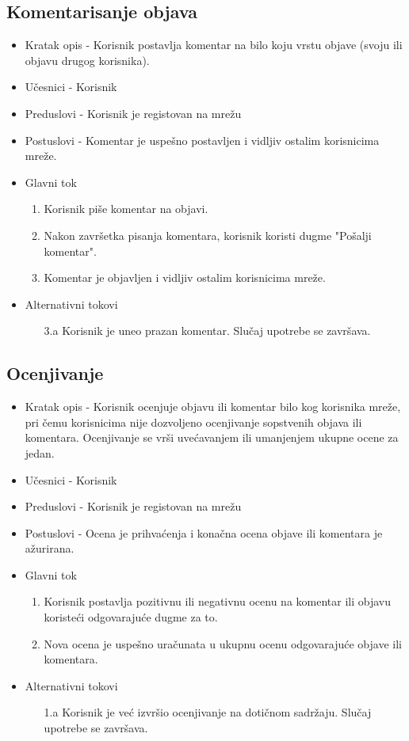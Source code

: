 \subsection{Komentarisanje objava}
\begin{itemize}
\item Kratak opis - Korisnik postavlja komentar na bilo koju vrstu objave (svoju ili objavu drugog korisnika). 
\item Učesnici - Korisnik
\item Preduslovi - Korisnik je registovan na mrežu
\item Postuslovi - Komentar je uspešno postavljen i vidljiv ostalim korisnicima mreže.
\item Glavni tok
	\begin{enumerate}
	\item Korisnik piše komentar na objavi.
	\item Nakon završetka pisanja komentara, korisnik koristi dugme "Pošalji komentar". 
	\item Komentar je objavljen i vidljiv ostalim korisnicima mreže.
	\end{enumerate}
\item Alternativni tokovi
    \begin{itemize}
	\item[3.a] Korisnik je uneo prazan komentar. Slučaj upotrebe se završava.
	\end{itemize}
\end{itemize}

\subsection{Ocenjivanje}
\begin{itemize}
\item Kratak opis - Korisnik ocenjuje objavu ili komentar bilo kog korisnika mreže, pri čemu korisnicima nije dozvoljeno ocenjivanje sopstvenih objava ili komentara. Ocenjivanje se vrši uvećavanjem ili umanjenjem ukupne ocene za jedan.
\item Učesnici - Korisnik
\item Preduslovi - Korisnik je registovan na mrežu
\item Postuslovi - Ocena je prihvaćenja i konačna ocena objave ili komentara je ažurirana.
\item Glavni tok
	\begin{enumerate}
	\item Korisnik postavlja pozitivnu ili negativnu ocenu na komentar ili objavu koristeći odgovarajuće dugme za to.
	\item Nova ocena je uspešno uračunata u ukupnu ocenu odgovarajuće objave ili komentara.
	\end{enumerate}
\item Alternativni tokovi
    \begin{itemize}
	\item[1.a] Korisnik je već izvršio ocenjivanje na dotičnom sadržaju. Slučaj upotrebe se završava.
	\end{itemize}
\end{itemize}

